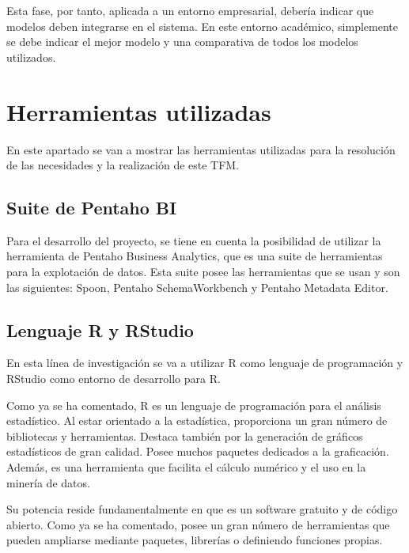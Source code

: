 Esta fase, por tanto, aplicada a un entorno empresarial, debería indicar que modelos deben integrarse en el sistema. En este entorno académico, simplemente se debe indicar el mejor modelo y una comparativa de todos los modelos utilizados.





\section{Herramientas utilizadas}
En este apartado se van a mostrar las herramientas utilizadas para la resolución de las necesidades y la realización de este TFM.

\subsection{Suite de Pentaho BI}
Para el desarrollo del proyecto, se tiene en cuenta la posibilidad de utilizar la herramienta de Pentaho Business Analytics, que es una suite de herramientas para la explotación de datos. Esta suite posee las herramientas que se usan y son las siguientes: Spoon, Pentaho SchemaWorkbench y Pentaho Metadata Editor.

\subsection{Lenguaje R y RStudio}
En esta línea de investigación se va a utilizar R como lenguaje de programación y RStudio como entorno de desarrollo para R.

Como ya se ha comentado, R es un lenguaje de programación para el análisis estadístico. Al estar orientado a la estadística, proporciona un gran número de bibliotecas y herramientas. Destaca también por la generación de gráficos estadísticos de gran calidad. Posee muchos paquetes dedicados a la graficación. Además, es una herramienta que facilita el cálculo numérico y el uso en la minería de datos. \cite{emanuel2014}

Su potencia reside fundamentalmente en que es un software gratuito y de código abierto. Como ya se ha comentado, posee un gran número de herramientas que pueden ampliarse mediante paquetes, librerías o definiendo funciones propias.


